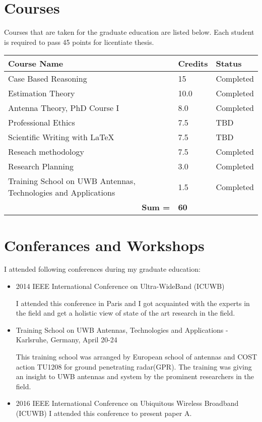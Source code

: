 \section{Courses}
\label{Courses}
Courses that are taken for the graduate education are listed below. Each student is required to pass 45 points for licentiate thesis.
\begin{center}
	\begin{tabular}{| l | l | l |}
		\hline
		\textbf{Course Name} & \textbf{Credits} & \textbf{Status} \\ \hline
		Case Based Reasoning & 15 & Completed \\ \hline
		Estimation Theory & 10.0 & Completed \\ \hline
		Antenna Theory, PhD Course I & 8.0 & Completed \\ \hline
		Professional Ethics & 7.5 & TBD \\ \hline
		Scientific Writing with LaTeX & 7.5 & TBD \\
		\hline
		Reseach methodology & 7.5 & Completed \\
		\hline
		Research Planning & 3.0 & Completed \\ \hline
		Training School on UWB Antennas, Technologies and Applications & 1.5 & Completed \\ \hline
		\multicolumn{1}{r}{\textbf{Sum =}}&\multicolumn{2}{l}{\textbf{60}} \\
	\end{tabular}
\end{center}

\section{Conferances and Workshops}
I attended following conferences during my graduate education: 
\label{Conferances}
\begin{itemize}
	\item 2014 IEEE International Conference on Ultra-WideBand (ICUWB)
	
	I attended this conference in Paris and I got acquainted with the experts in the field and get a holistic view of state of the art research in the field.
	\item Training School on UWB Antennas, Technologies and Applications - Karlsruhe, Germany, April 20-24
	
	This training school was arranged by European school of antennas and COST action TU1208 for ground penetrating radar(GPR). The training was giving an insight to UWB antennas and system by the prominent researchers in the field.  
	\item 2016 IEEE International Conference on Ubiquitous Wireless Broadband (ICUWB)
	I attended this conference to present paper A.
\end{itemize}



